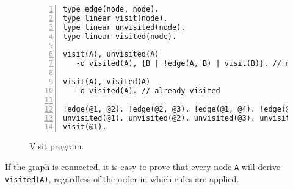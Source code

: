 \begin{figure}[h!]
\scriptsize\begin{Verbatim}[numbers=left]
type edge(node, node).
type linear visit(node).
type linear unvisited(node).
type linear visited(node).

visit(A), unvisited(A)
   -o visited(A), {B | !edge(A, B) | visit(B)}. // mark node as visited and visit neighbors

visit(A), visited(A)
   -o visited(A). // already visited

!edge(@1, @2). !edge(@2, @3). !edge(@1, @4). !edge(@2, @4).
unvisited(@1). unvisited(@2). unvisited(@3). unvisited(@4).
visit(@1).
\end{Verbatim}
  \caption{Visit program.}
  \label{code:visit}
\end{figure}
\normalsize

If the graph is connected, it is easy to prove that every node \texttt{A} will derive \texttt{visited(A)},
regardless of the order in which rules are applied.